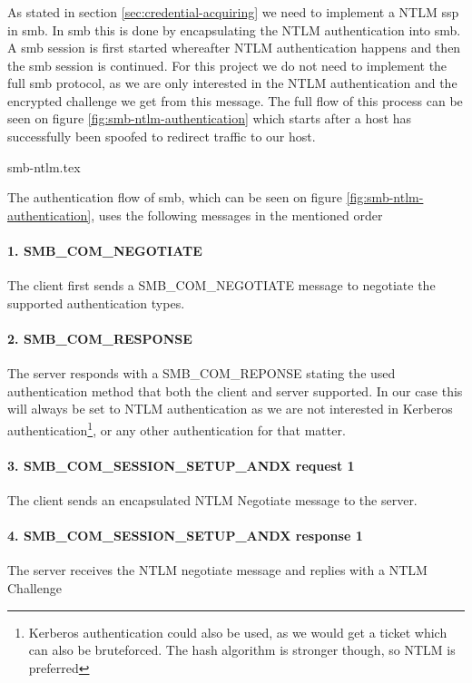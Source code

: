 \documentclass{article}
\begin{document}
\subsubsection{}
As stated in section \ref{sec:credential-acquiring} we need to implement a NTLM \gls{ssp} in \gls{smb}. In \gls{smb} this is done by encapsulating the NTLM authentication into \gls{smb}.
A \gls{smb} session is first started whereafter NTLM authentication happens and then the \gls{smb} session is continued. For this project we do not need to implement the full \gls{smb} protocol, as we are only interested in the NTLM authentication and the encrypted challenge we get from this message. The full flow of this process can be seen on figure \ref{fig:smb-ntlm-authentication} which starts after a host has successfully been spoofed to redirect traffic to our host.

{smb-ntlm.tex}

The authentication flow of \gls{smb}, which can be seen on figure \ref{fig:smb-ntlm-authentication}, uses the following messages in the mentioned order
\paragraph{1. SMB\_COM\_NEGOTIATE} The client first sends a SMB\_COM\_NEGOTIATE message to negotiate the supported authentication types.
\paragraph{2. SMB\_COM\_RESPONSE} The server responds with a SMB\_COM\_REPONSE stating the used authentication method that both the client and server supported. In our case this will always be set to NTLM authentication as we are not interested in Kerberos authentication\footnote{Kerberos authentication could also be used, as we would get a ticket which can also be bruteforced. The hash algorithm is stronger though, so NTLM is preferred}, or any other authentication for that matter.
\paragraph{3. SMB\_COM\_SESSION\_SETUP\_ANDX request 1} The client sends an encapsulated NTLM Negotiate message to the server.
\paragraph{4. SMB\_COM\_SESSION\_SETUP\_ANDX response 1} The server receives the NTLM negotiate message and replies with a NTLM Challenge
\end{document}
